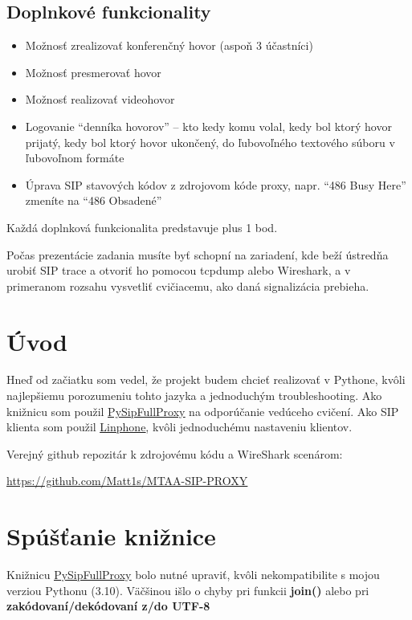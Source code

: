 \documentclass[10pt,oneside,slovak,a4paper]{article}
\begin{document}
\subsection{Doplnkové funkcionality}
\begin{itemize}
\item{Možnosť zrealizovať konferenčný hovor (aspoň 3 účastníci)}
\item{Možnosť presmerovať hovor}
\item{Možnosť realizovať videohovor}
\item{Logovanie “denníka hovorov” – kto kedy komu volal, kedy bol ktorý hovor prijatý, kedy bol ktorý 
hovor ukončený, do ľubovoľného textového súboru v ľubovoľnom formáte}
\item{Úprava SIP stavových kódov z zdrojovom kóde proxy, napr. “486 Busy Here” zmeníte na “486 
Obsadené”}
\end{itemize}

Každá doplnková funkcionalita predstavuje plus 1 bod.

Počas prezentácie zadania musíte byť schopní na zariadení, kde beží ústredňa urobiť SIP trace a otvoriť 
ho pomocou tcpdump alebo Wireshark, a v primeranom rozsahu vysvetliť cvičiacemu, ako daná 
signalizácia prebieha.

\section{Úvod}
Hneď od začiatku som vedel, že projekt budem chcieť realizovať v Pythone, kvôli najlepšiemu porozumeniu tohto jazyka a jednoduchým troubleshooting.
Ako knižnicu som použil \href{https://github.com/tirfil/PySipFullProxy/blob/master/sipfullproxy.py}{\underline{PySipFullProxy}} na odporúčanie vedúceho cvičení.
Ako SIP klienta som použil \href{https://www.linphone.org/}{\underline{Linphone}}, kvôli jednoduchému nastaveniu klientov.

\medskip
Verejný github repozitár k zdrojovému kódu a WireShark scenárom:

\href{https://github.com/Matt1s/MTAA-SIP-PROXY}{\underline{https://github.com/Matt1s/MTAA-SIP-PROXY}}

\section{Spúšťanie knižnice}
Knižnicu \href{https://github.com/tirfil/PySipFullProxy/blob/master/sipfullproxy.py}{\underline{PySipFullProxy}} bolo nutné upraviť, kvôli nekompatibilite s mojou verziou Pythonu (3.10).
Väčšinou išlo o chyby pri funkcii \textbf{join()} alebo pri \textbf{zakódovaní/dekódovaní z/do UTF-8}
\end{document}
